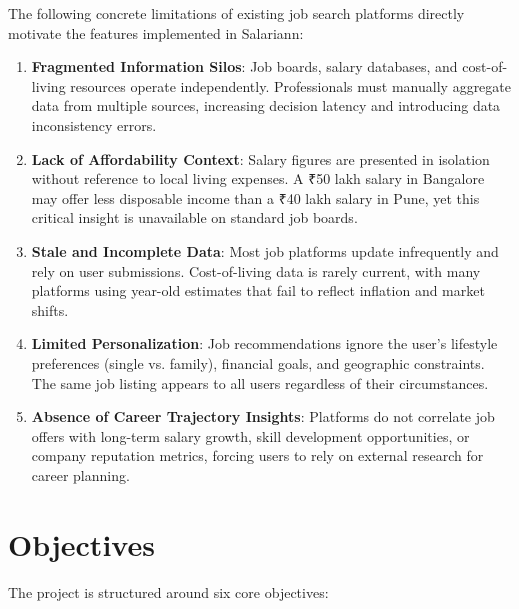 The following concrete limitations of existing job search platforms directly motivate the features implemented in Salariann:

\begin{enumerate}
    \item \textbf{Fragmented Information Silos}: Job boards, salary databases, and cost-of-living resources operate independently. Professionals must manually aggregate data from multiple sources, increasing decision latency and introducing data inconsistency errors.
    
    \item \textbf{Lack of Affordability Context}: Salary figures are presented in isolation without reference to local living expenses. A ₹50 lakh salary in Bangalore may offer less disposable income than a ₹40 lakh salary in Pune, yet this critical insight is unavailable on standard job boards.
    
    \item \textbf{Stale and Incomplete Data}: Most job platforms update infrequently and rely on user submissions. Cost-of-living data is rarely current, with many platforms using year-old estimates that fail to reflect inflation and market shifts.
    
    \item \textbf{Limited Personalization}: Job recommendations ignore the user's lifestyle preferences (single vs. family), financial goals, and geographic constraints. The same job listing appears to all users regardless of their circumstances.
    
    \item \textbf{Absence of Career Trajectory Insights}: Platforms do not correlate job offers with long-term salary growth, skill development opportunities, or company reputation metrics, forcing users to rely on external research for career planning.
\end{enumerate}

\section{Objectives}

The project is structured around six core objectives:


